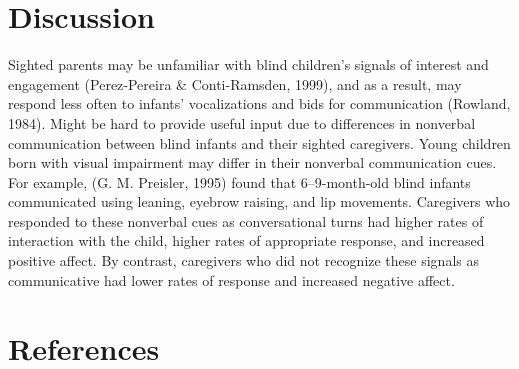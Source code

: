 \documentclass[
  man]{apa6}
\begin{document}
\hypertarget{discussion}{%
\section{Discussion}\label{discussion}}

Sighted parents may be unfamiliar with blind children's signals of interest and engagement (Perez-Pereira \& Conti-Ramsden, 1999), and as a result, may respond less often to infants' vocalizations and bids for communication (Rowland, 1984). Might be hard to provide useful input due to differences in nonverbal communication between blind infants and their sighted caregivers. Young children born with visual impairment may differ in their nonverbal communication cues. For example, (G. M. Preisler, 1995) found that 6--9-month-old blind infants communicated using leaning, eyebrow raising, and lip movements. Caregivers who responded to these nonverbal cues as conversational turns had higher rates of interaction with the child, higher rates of appropriate response, and increased positive affect. By contrast, caregivers who did not recognize these signals as communicative had lower rates of response and increased negative affect.

\pagebreak

\hypertarget{references}{%
\section*{References}\label{references}}
\end{document}
